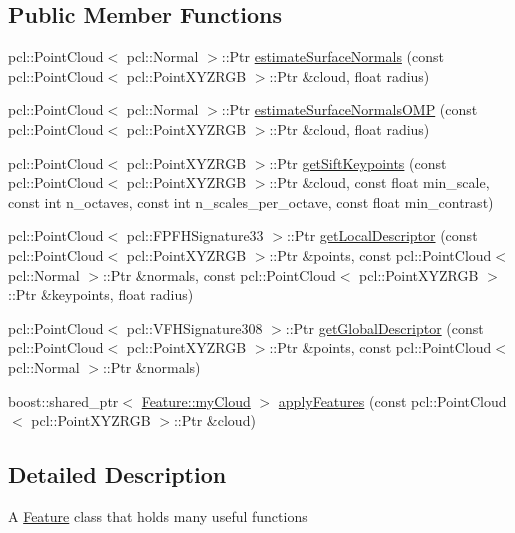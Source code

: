 \subsection*{Public Member Functions}
\begin{DoxyCompactItemize}
\item 
pcl\+::\+Point\+Cloud$<$ pcl\+::\+Normal $>$\+::Ptr \hyperlink{class_feature_a2160d57e3a1502d84bd87dd3a3b5da9c}{estimate\+Surface\+Normals} (const pcl\+::\+Point\+Cloud$<$ pcl\+::\+Point\+X\+Y\+Z\+R\+GB $>$\+::Ptr \&cloud, float radius)
\item 
pcl\+::\+Point\+Cloud$<$ pcl\+::\+Normal $>$\+::Ptr \hyperlink{class_feature_afadf68008d421f98696ee7e60e4b28a6}{estimate\+Surface\+Normals\+O\+MP} (const pcl\+::\+Point\+Cloud$<$ pcl\+::\+Point\+X\+Y\+Z\+R\+GB $>$\+::Ptr \&cloud, float radius)
\item 
pcl\+::\+Point\+Cloud$<$ pcl\+::\+Point\+X\+Y\+Z\+R\+GB $>$\+::Ptr \hyperlink{class_feature_a448116b76768ad35cdda20deee99d0d1}{get\+Sift\+Keypoints} (const pcl\+::\+Point\+Cloud$<$ pcl\+::\+Point\+X\+Y\+Z\+R\+GB $>$\+::Ptr \&cloud, const float min\+\_\+scale, const int n\+\_\+octaves, const int n\+\_\+scales\+\_\+per\+\_\+octave, const float min\+\_\+contrast)
\item 
pcl\+::\+Point\+Cloud$<$ pcl\+::\+F\+P\+F\+H\+Signature33 $>$\+::Ptr \hyperlink{class_feature_a89423b19d0d8c4ed67b4b625ddf5422f}{get\+Local\+Descriptor} (const pcl\+::\+Point\+Cloud$<$ pcl\+::\+Point\+X\+Y\+Z\+R\+GB $>$\+::Ptr \&points, const pcl\+::\+Point\+Cloud$<$ pcl\+::\+Normal $>$\+::Ptr \&normals, const pcl\+::\+Point\+Cloud$<$ pcl\+::\+Point\+X\+Y\+Z\+R\+GB $>$\+::Ptr \&keypoints, float radius)
\item 
pcl\+::\+Point\+Cloud$<$ pcl\+::\+V\+F\+H\+Signature308 $>$\+::Ptr \hyperlink{class_feature_ab2180a5c65923e5334204be9bf0fbd74}{get\+Global\+Descriptor} (const pcl\+::\+Point\+Cloud$<$ pcl\+::\+Point\+X\+Y\+Z\+R\+GB $>$\+::Ptr \&points, const pcl\+::\+Point\+Cloud$<$ pcl\+::\+Normal $>$\+::Ptr \&normals)
\item 
boost\+::shared\+\_\+ptr$<$ \hyperlink{struct_feature_1_1my_cloud}{Feature\+::my\+Cloud} $>$ \hyperlink{class_feature_acf2008a37df967514cb04d0598aa1c79}{apply\+Features} (const pcl\+::\+Point\+Cloud$<$ pcl\+::\+Point\+X\+Y\+Z\+R\+GB $>$\+::Ptr \&cloud)
\end{DoxyCompactItemize}


\subsection{Detailed Description}
A \hyperlink{class_feature}{Feature} class that holds many useful functions 

